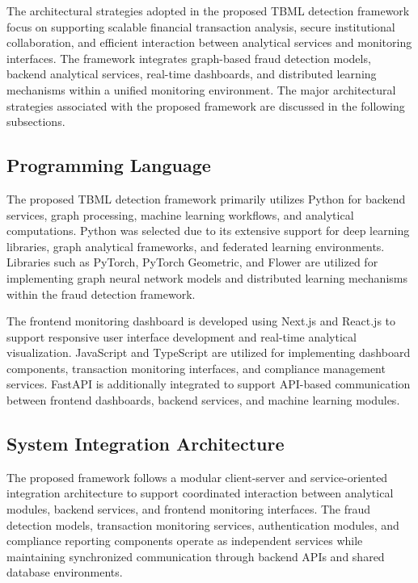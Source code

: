 The architectural strategies adopted in the proposed TBML detection framework focus on supporting scalable financial transaction analysis, secure institutional collaboration, and efficient interaction between analytical services and monitoring interfaces. The framework integrates graph-based fraud detection models, backend analytical services, real-time dashboards, and distributed learning mechanisms within a unified monitoring environment. The major architectural strategies associated with the proposed framework are discussed in the following subsections.


\subsection[Programming Language]{\textbf{Programming Language}}

The proposed TBML detection framework primarily utilizes Python for backend services, graph processing, machine learning workflows, and analytical computations. Python was selected due to its extensive support for deep learning libraries, graph analytical frameworks, and federated learning environments. Libraries such as PyTorch, PyTorch Geometric, and Flower are utilized for implementing graph neural network models and distributed learning mechanisms within the fraud detection framework.

The frontend monitoring dashboard is developed using Next.js and React.js to support responsive user interface development and real-time analytical visualization. JavaScript and TypeScript are utilized for implementing dashboard components, transaction monitoring interfaces, and compliance management services. FastAPI is additionally integrated to support API-based communication between frontend dashboards, backend services, and machine learning modules.


\subsection[System Integration Architecture]{\textbf{System Integration Architecture}}

The proposed framework follows a modular client-server and service-oriented integration architecture to support coordinated interaction between analytical modules, backend services, and frontend monitoring interfaces. The fraud detection models, transaction monitoring services, authentication modules, and compliance reporting components operate as independent services while maintaining synchronized communication through backend APIs and shared database environments.


